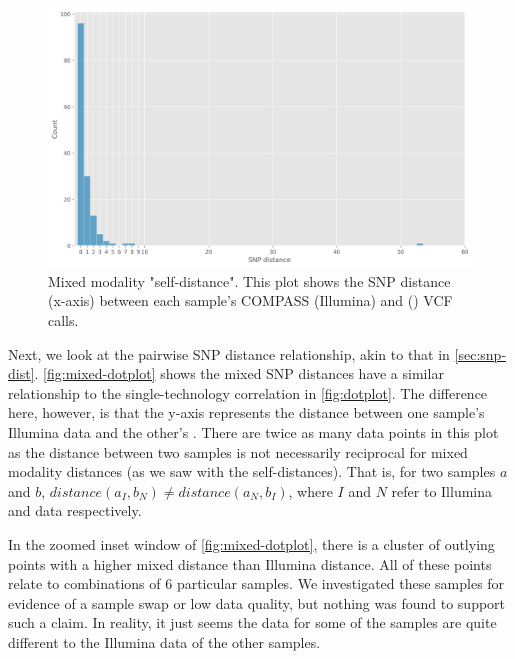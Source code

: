 \begin{figure}
\begin{center}
\includegraphics[width=0.90\columnwidth]{Chapter2/Figs/mixed_self_dist.png}
\caption{{Mixed modality "self-distance". This plot shows the SNP distance (x-axis) between each sample's COMPASS (Illumina) and \bcftools{} (\ont{}) VCF calls.
\label{fig:self-dist}
}}
\end{center}
\end{figure}

\noindent
Next, we look at the pairwise SNP distance relationship, akin to that in \autoref{sec:snp-dist}. \autoref{fig:mixed-dotplot} shows the mixed SNP distances have a similar relationship to the single-technology correlation in \autoref{fig:dotplot}. The difference here, however, is that the y-axis represents the distance between one sample's Illumina data and the other's \ont{}. There are twice as many data points in this plot as the distance between two samples is not necessarily reciprocal for mixed modality distances (as we saw with the self-distances). That is, for two samples $a$ and $b$, $distance(a_I,b_N) \neq distance(a_N, b_I)$, where $I$ and $N$ refer to Illumina and \ont{} data respectively. 

In the zoomed inset window of \autoref{fig:mixed-dotplot}, there is a cluster of outlying points with a higher mixed distance than Illumina distance. All of these points relate to combinations of 6 particular samples. We investigated these samples for evidence of a sample swap or low data quality, but nothing was found to support such a claim. In reality, it just seems the \ont{} data for some of the samples are quite different to the Illumina data of the other samples.

